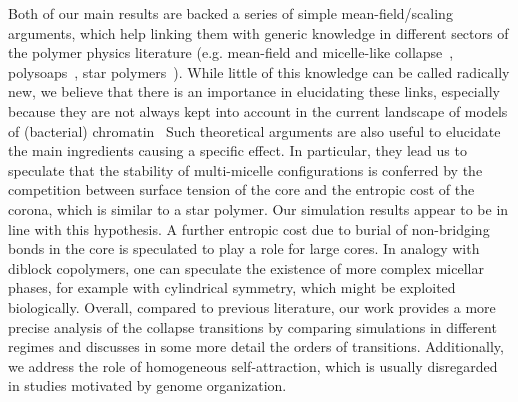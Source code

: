 \documentclass[
preprint,
a4paper,
12pt,
superscriptaddress,
pre]{revtex4}
\begin{document}
Both of our main results are backed a series of simple
mean-field/scaling arguments, which help linking them with generic
knowledge in different sectors of the polymer physics literature
(e.g. mean-field and micelle-like
collapse~\cite{DeGennes1975,Marenduzzo2006c},
polysoaps~\cite{Borisov1996}, star polymers~\cite{Daoud1982,Hsu2004}).
While little of this knowledge can be called radically new, we believe
that there is an importance in elucidating these links, especially
because they are not always kept into account in the current landscape
of models of (bacterial) chromatin~\cite{Benza2012,Barbieri2013a}
Such theoretical arguments are also useful to elucidate the main
ingredients causing a specific effect. In particular, they lead us to
speculate that the stability of multi-micelle configurations is
conferred by the competition between surface tension of the core and
the entropic cost of the corona, which is similar to a star
polymer. Our simulation results appear to be in line with this
hypothesis. A further entropic cost due to burial of non-bridging
bonds in the core is speculated to play a role for  large cores.
In analogy with diblock copolymers, one can speculate the existence of
more complex micellar phases, for example with cylindrical symmetry,
which might be exploited biologically. 
Overall, compared to previous literature, our work provides a more
precise analysis of the collapse transitions by comparing simulations
in different regimes and discusses in some more detail the orders
of transitions. Additionally, we address the role of homogeneous
self-attraction, which is usually disregarded in studies motivated by
genome organization.
\end{document}
